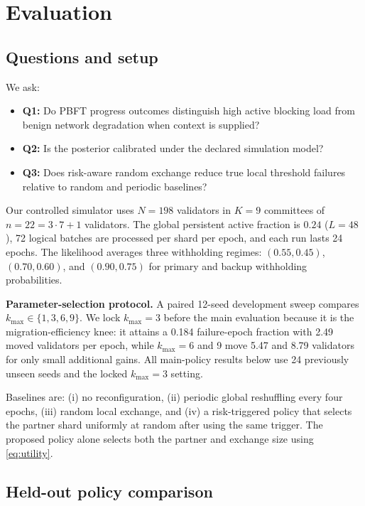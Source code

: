 \documentclass[10pt,conference]{IEEEtran}
\begin{document}
\section{Evaluation}

\subsection{Questions and setup}

We ask:
\begin{itemize}[leftmargin=13pt,itemsep=1pt]
\item \textbf{Q1:} Do PBFT progress outcomes distinguish high active blocking load from benign network degradation when context is supplied?
\item \textbf{Q2:} Is the posterior calibrated under the declared simulation model?
\item \textbf{Q3:} Does risk-aware random exchange reduce true local threshold failures relative to random and periodic baselines?
\end{itemize}

Our controlled simulator uses $N=198$ validators in $K=9$ committees of $n=22=3\cdot7+1$ validators. The global persistent active fraction is $0.24$ ($L=48$), 72 logical batches are processed per shard per epoch, and each run lasts 24 epochs. The likelihood averages three withholding regimes: $(0.55,0.45)$, $(0.70,0.60)$, and $(0.90,0.75)$ for primary and backup withholding probabilities.

\textbf{Parameter-selection protocol.} A paired 12-seed development sweep compares $k_{\max}\in\{1,3,6,9\}$. We lock $k_{\max}=3$ before the main evaluation because it is the migration-efficiency knee: it attains a 0.184 failure-epoch fraction with 2.49 moved validators per epoch, while $k_{\max}=6$ and 9 move 5.47 and 8.79 validators for only small additional gains. All main-policy results below use 24 previously unseen seeds and the locked $k_{\max}=3$ setting.

Baselines are: (i) no reconfiguration, (ii) periodic global reshuffling every four epochs, (iii) random local exchange, and (iv) a risk-triggered policy that selects the partner shard uniformly at random after using the same trigger. The proposed policy alone selects both the partner and exchange size using \eqref{eq:utility}.

\subsection{Held-out policy comparison}
\end{document}
